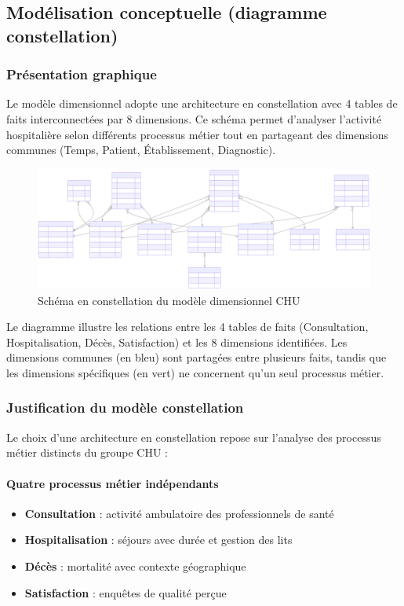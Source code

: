 \documentclass[12pt,a4paper]{article}
\begin{document}
\subsection{Modélisation conceptuelle (diagramme constellation)}

\subsubsection{Présentation graphique}

Le modèle dimensionnel adopte une architecture en constellation avec 4 tables de faits interconnectées par 8 dimensions. Ce schéma permet d'analyser l'activité hospitalière selon différents processus métier tout en partageant des dimensions communes (Temps, Patient, Établissement, Diagnostic).

\begin{figure}[H]
\centering
\includegraphics[width=\textwidth]{diagramme_dimensions.svg}
\caption{Schéma en constellation du modèle dimensionnel CHU}
\label{fig:constellation}
\end{figure}

Le diagramme illustre les relations entre les 4 tables de faits (Consultation, Hospitalisation, Décès, Satisfaction) et les 8 dimensions identifiées. Les dimensions communes (en bleu) sont partagées entre plusieurs faits, tandis que les dimensions spécifiques (en vert) ne concernent qu'un seul processus métier.

\subsubsection{Justification du modèle constellation}

Le choix d'une architecture en constellation repose sur l'analyse des processus métier distincts du groupe CHU :

\paragraph{Quatre processus métier indépendants}
\begin{itemize}[leftmargin=*]
    \item \textbf{Consultation} : activité ambulatoire des professionnels de santé
    \item \textbf{Hospitalisation} : séjours avec durée et gestion des lits
    \item \textbf{Décès} : mortalité avec contexte géographique
    \item \textbf{Satisfaction} : enquêtes de qualité perçue
\end{itemize}
\end{document}
